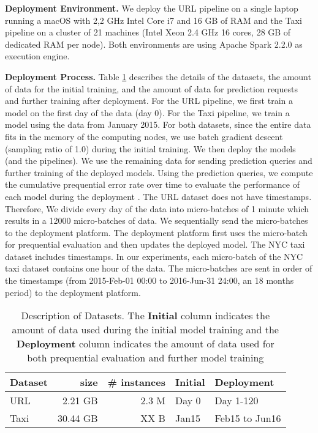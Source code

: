 \textbf{Deployment Environment. }
We deploy the URL pipeline on a single laptop running a macOS with 2,2 GHz Intel Core i7 and 16 GB of RAM and the Taxi pipeline on a cluster of 21 machines (Intel Xeon 2.4 GHz 16 cores, 28 GB of dedicated RAM per node).
Both environments are using Apache Spark 2.2.0 as execution engine.

\textbf{Deployment Process. }
Table \ref{dataset-description} describes the details of the datasets, the amount of data for the initial training, and the amount of data for prediction requests and further training after deployment. 
For the URL pipeline, we first train a model on the first day of the data (day 0).
For the Taxi pipeline, we train a model using the data from January 2015.
For both datasets, since the entire data fits in the memory of the computing nodes, we use batch gradient descent (sampling ratio of 1.0) during the initial training.
We then deploy the models (and the pipelines).
We use the remaining data for sending prediction queries and further training of the deployed models.
Using the prediction queries, we compute the cumulative prequential error rate over time to evaluate the performance of each model during the deployment \cite{dawid1984present}.
The URL dataset does not have timestamps. 
Therefore, We divide every day of the data into micro-batches of 1 minute which results in a 12000 micro-batches of data.
We sequentially send the micro-batches to the deployment platform.
The deployment platform first uses the micro-batch for prequential evaluation and then updates the deployed model.
The NYC taxi dataset includes timestamps. 
In our experiments, each micro-batch of the NYC taxi dataset contains one hour of the data. 
The micro-batches are sent in order of the timestamps (from 2015-Feb-01  00:00 to 2016-Jun-31 24:00, an 18 months period) to the deployment platform.

\begin{table}[h!]
\centering
\begin{tabular}{lrrll}
\hline
\textbf{Dataset}  & \textbf{size} &\textbf{\# instances} & \textbf{Initial} & \textbf{Deployment} \\
\hline
URL        &  2.21 GB 	& 2.3 M  			& Day 0        	  & Day 1-120          \\
Taxi        &  30.44 GB 	& XX B              & Jan15              & Feb15 to Jun16    \\
\hline
\end{tabular}
\caption{Description of Datasets. The \textbf{Initial} column indicates the amount of data used during the initial model training and the \textbf{Deployment} column indicates the amount of data used for both prequential evaluation and further model training}  
\label{dataset-description}
\end{table}


